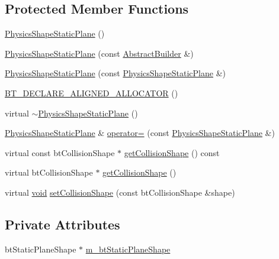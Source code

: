 \subsection*{Protected Member Functions}
\begin{DoxyCompactItemize}
\item 
\mbox{\hyperlink{classnjli_1_1_physics_shape_static_plane_a8ed62d505376e5dbba222757423ba84b}{Physics\+Shape\+Static\+Plane}} ()
\item 
\mbox{\hyperlink{classnjli_1_1_physics_shape_static_plane_a95a9c5270ae2e9e29154332a8dc93860}{Physics\+Shape\+Static\+Plane}} (const \mbox{\hyperlink{classnjli_1_1_abstract_builder}{Abstract\+Builder}} \&)
\item 
\mbox{\hyperlink{classnjli_1_1_physics_shape_static_plane_a75169e547ba98dff8be05aeda01b2fda}{Physics\+Shape\+Static\+Plane}} (const \mbox{\hyperlink{classnjli_1_1_physics_shape_static_plane}{Physics\+Shape\+Static\+Plane}} \&)
\item 
\mbox{\hyperlink{classnjli_1_1_physics_shape_static_plane_aa2b1b0428a56aaadba2ba7ed240c8f54}{B\+T\+\_\+\+D\+E\+C\+L\+A\+R\+E\+\_\+\+A\+L\+I\+G\+N\+E\+D\+\_\+\+A\+L\+L\+O\+C\+A\+T\+OR}} ()
\item 
virtual \mbox{\hyperlink{classnjli_1_1_physics_shape_static_plane_af8611cf655223b9f34c8b029127d269f}{$\sim$\+Physics\+Shape\+Static\+Plane}} ()
\item 
\mbox{\hyperlink{classnjli_1_1_physics_shape_static_plane}{Physics\+Shape\+Static\+Plane}} \& \mbox{\hyperlink{classnjli_1_1_physics_shape_static_plane_a617dd0ea0639d4beda545af3f37b31da}{operator=}} (const \mbox{\hyperlink{classnjli_1_1_physics_shape_static_plane}{Physics\+Shape\+Static\+Plane}} \&)
\item 
virtual const bt\+Collision\+Shape $\ast$ \mbox{\hyperlink{classnjli_1_1_physics_shape_static_plane_a59b7263115001da7a90c30b375ac6b80}{get\+Collision\+Shape}} () const
\item 
virtual bt\+Collision\+Shape $\ast$ \mbox{\hyperlink{classnjli_1_1_physics_shape_static_plane_a3a3e5928c3f1a0e944c583025962f418}{get\+Collision\+Shape}} ()
\item 
virtual \mbox{\hyperlink{_thread_8h_af1e856da2e658414cb2456cb6f7ebc66}{void}} \mbox{\hyperlink{classnjli_1_1_physics_shape_static_plane_a5ebd80dd3f719bc9f172f29e3bdf290d}{set\+Collision\+Shape}} (const bt\+Collision\+Shape \&shape)
\end{DoxyCompactItemize}
\subsection*{Private Attributes}
\begin{DoxyCompactItemize}
\item 
bt\+Static\+Plane\+Shape $\ast$ \mbox{\hyperlink{classnjli_1_1_physics_shape_static_plane_ab6d17e2865a59caf1bd6022df162b258}{m\+\_\+bt\+Static\+Plane\+Shape}}
\end{DoxyCompactItemize}
